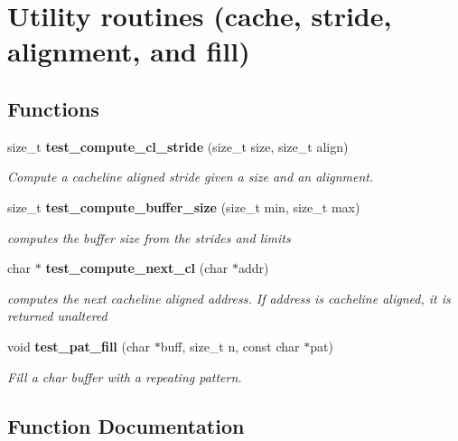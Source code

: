 \section{Utility routines (cache, stride, alignment, and fill)}
\label{group__test__comp}
\subsection*{Functions}
\begin{CompactItemize}
\item 
size\_\-t {\bf test\_\-compute\_\-cl\_\-stride} (size\_\-t size, size\_\-t align)
\begin{CompactList}\small\item\em Compute a cacheline aligned stride given a size and an alignment.\item\end{CompactList}\item 
size\_\-t {\bf test\_\-compute\_\-buffer\_\-size} (size\_\-t min, size\_\-t max)
\begin{CompactList}\small\item\em computes the buffer size from the strides and limits\item\end{CompactList}\item 
char $\ast$ {\bf test\_\-compute\_\-next\_\-cl} (char $\ast$addr)
\begin{CompactList}\small\item\em computes the next cacheline aligned address. If address is cacheline aligned, it is returned unaltered\item\end{CompactList}\item 
void {\bf test\_\-pat\_\-fill} (char $\ast$buff, size\_\-t n, const char $\ast$pat)
\begin{CompactList}\small\item\em Fill a char buffer with a repeating pattern.\item\end{CompactList}\end{CompactItemize}


\subsection{Function Documentation}

